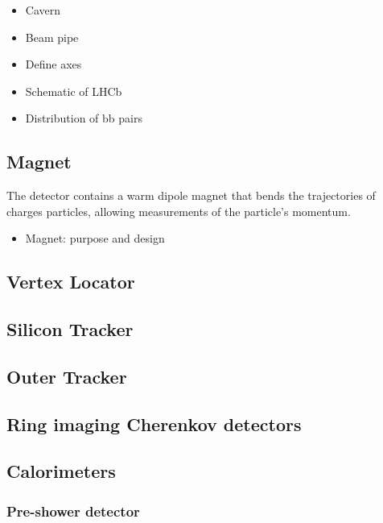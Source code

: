 {\color{Red}
\begin{itemize}
\item Cavern
\item Beam pipe
\item Define axes 
\end{itemize}
}

{\color{Green}
\begin{itemize}
\item Schematic of LHCb
\item Distribution of bb pairs
\end{itemize}
}

\subsection{Magnet}

The \lhcb detector contains a warm dipole magnet that bends the trajectories of charges particles, allowing measurements of the particle's momentum. 
{\color{Red}
\begin{itemize}
\item Magnet: purpose and design 
\end{itemize}
}


\subsection{Vertex Locator}
\subsection{Silicon Tracker}
\subsection{Outer Tracker}
\subsection{Ring imaging Cherenkov detectors}
\subsubsection{\richone}
\subsubsection{\richtwo}
\subsection{Calorimeters}
\subsubsection{Pre-shower detector}

